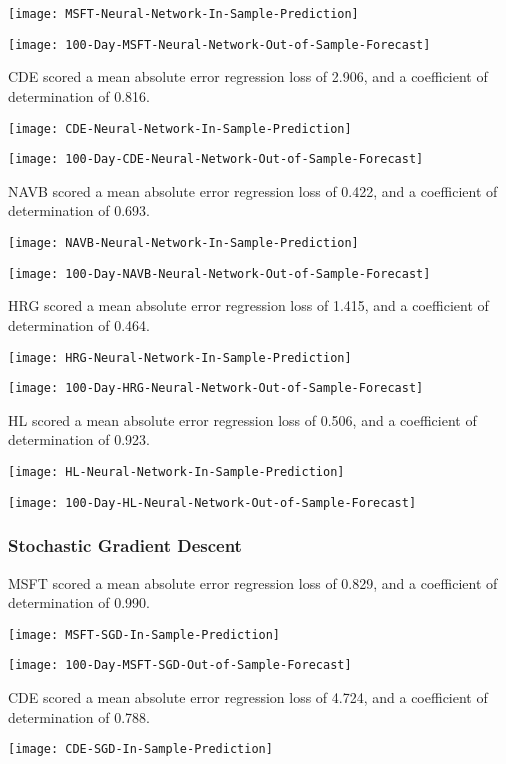 \texttt{[image: MSFT-Neural-Network-In-Sample-Prediction]}

\texttt{[image: 100-Day-MSFT-Neural-Network-Out-of-Sample-Forecast]}

CDE scored a mean absolute error regression loss of 2.906, and a coefficient of determination of 0.816.

\texttt{[image: CDE-Neural-Network-In-Sample-Prediction]}

\texttt{[image: 100-Day-CDE-Neural-Network-Out-of-Sample-Forecast]}

NAVB scored a mean absolute error regression loss of 0.422, and a coefficient of determination of 0.693.

\texttt{[image: NAVB-Neural-Network-In-Sample-Prediction]}

\texttt{[image: 100-Day-NAVB-Neural-Network-Out-of-Sample-Forecast]}

HRG scored a mean absolute error regression loss of 1.415, and a coefficient of determination of 0.464.

\texttt{[image: HRG-Neural-Network-In-Sample-Prediction]}

\texttt{[image: 100-Day-HRG-Neural-Network-Out-of-Sample-Forecast]}

HL scored a mean absolute error regression loss of 0.506, and a coefficient of determination of 0.923.

\texttt{[image: HL-Neural-Network-In-Sample-Prediction]}

\texttt{[image: 100-Day-HL-Neural-Network-Out-of-Sample-Forecast]}

\subsubsection{Stochastic Gradient Descent}
MSFT scored a mean absolute error regression loss of 0.829, and a coefficient of determination of 0.990.

\texttt{[image: MSFT-SGD-In-Sample-Prediction]}

\texttt{[image: 100-Day-MSFT-SGD-Out-of-Sample-Forecast]}

CDE scored a mean absolute error regression loss of 4.724, and a coefficient of determination of 0.788.

\texttt{[image: CDE-SGD-In-Sample-Prediction]}

